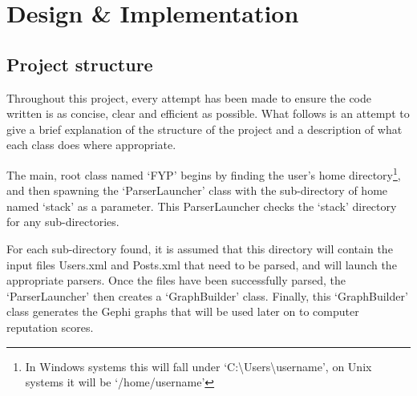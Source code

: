 \documentclass[]{final_report}
\begin{document}
\chapter{Design \& Implementation}


\section{Project structure}

Throughout this project, every attempt has been made to ensure the code written is as concise, clear and efficient as possible. What follows is an attempt to give a brief explanation of the structure of the project and a description of what each class does where appropriate. 

The main, root class named `FYP' begins by finding the user's home directory\footnote{In Windows systems this will fall under `C:\textbackslash Users\textbackslash username', on Unix systems it will be `/home/username'}, and then spawning the `ParserLauncher' class with the sub-directory of home named `stack' as a parameter. This ParserLauncher checks the `stack' directory for any sub-directories. 

For each sub-directory found, it is assumed that this directory will contain the input files Users.xml and Posts.xml that need to be parsed, and will launch the appropriate parsers. Once the files have been successfully parsed, the `ParserLauncher' then creates a `GraphBuilder' class. Finally, this `GraphBuilder' class generates the Gephi graphs that will be used later on to computer reputation scores.
\end{document}
